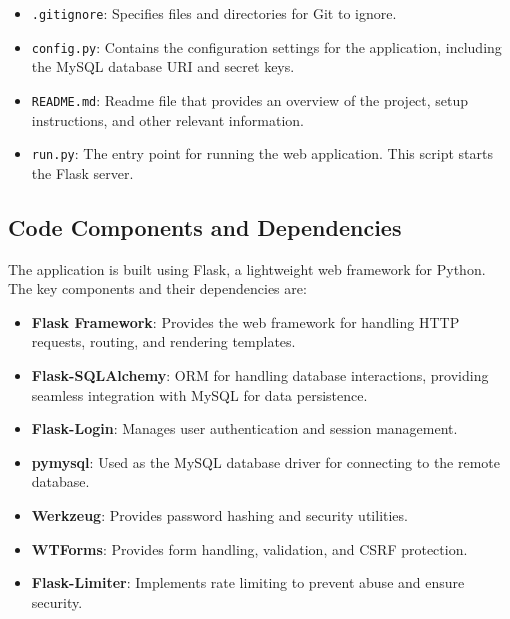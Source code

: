 \documentclass[12pt]{article}
\begin{document}
\begin{itemize}
\begin{itemize}
\begin{itemize}
        \end{itemize}
        \item \texttt{.gitignore}: Specifies files and directories for Git to ignore.
        \item \texttt{config.py}: Contains the configuration settings for the application, including the MySQL database URI and secret keys.
        \item \texttt{README.md}: Readme file that provides an overview of the project, setup instructions, and other relevant information.
        \item \texttt{run.py}: The entry point for running the web application. This script starts the Flask server.
    \end{itemize}
\end{itemize}

\subsection{Code Components and Dependencies}
The application is built using Flask, a lightweight web framework for Python. The key components and their dependencies are:
\begin{itemize}
    \item \textbf{Flask Framework}: Provides the web framework for handling HTTP requests, routing, and rendering templates.
    \item \textbf{Flask-SQLAlchemy}: ORM for handling database interactions, providing seamless integration with MySQL for data persistence.
    \item \textbf{Flask-Login}: Manages user authentication and session management.
    \item \textbf{pymysql}: Used as the MySQL database driver for connecting to the remote database.
    \item \textbf{Werkzeug}: Provides password hashing and security utilities.
    \item \textbf{WTForms}: Provides form handling, validation, and CSRF protection.
    \item \textbf{Flask-Limiter}: Implements rate limiting to prevent abuse and ensure security.
\end{itemize}
\end{document}
